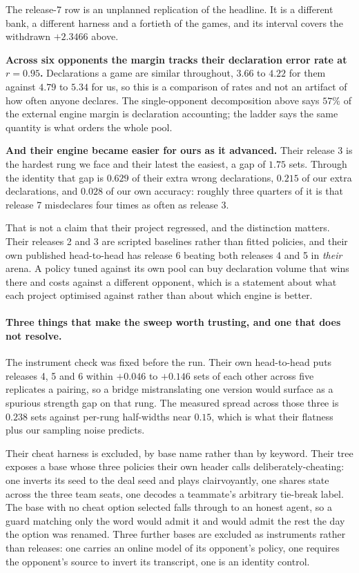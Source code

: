 \documentclass[11pt,letterpaper]{article}
\begin{document}
\noindent The release-7 row is an unplanned replication of the headline. It is a
different bank, a different harness and a fortieth of the games, and its
interval covers the withdrawn $+2.3466$ above.

\textbf{Across six opponents the margin tracks their declaration error rate at
$r = 0.95$.} Declarations a game are similar throughout, $3.66$ to $4.22$ for
them against $4.79$ to $5.34$ for us, so this is a comparison of rates and not
an artifact of how often anyone declares. The single-opponent decomposition
above says $57\%$ of the external engine margin is declaration accounting; the ladder
says the same quantity is what orders the whole pool.

\textbf{And their engine became easier for ours as it advanced.} Their release
3 is the hardest rung we face and their latest the easiest, a gap of $1.75$ sets.
Through the identity that gap is $0.629$ of their extra wrong declarations,
$0.215$ of our extra declarations, and $0.028$ of our own accuracy: roughly
three quarters of it is that release 7 misdeclares four times as often as release 3.

That is not a claim that their project regressed, and the distinction matters.
Their releases 2 and 3 are scripted baselines rather than fitted policies, and
their own published head-to-head has release 6 beating both releases 4 and 5 in
\emph{their} arena. A policy tuned against its own pool can buy declaration
volume that wins there and costs against a different opponent, which is a
statement about what each project optimised against rather than about which
engine is better.

\paragraph{Three things that make the sweep worth trusting, and one that does
not resolve.} The instrument check was fixed before the run. Their own
head-to-head puts releases 4, 5 and 6 within $+0.046$ to $+0.146$ sets of each
other across five replicates a pairing, so a bridge mistranslating one version
would surface as a spurious strength gap on that rung. The measured spread
across those three is $0.238$ sets against per-rung half-widths near $0.15$,
which is what their flatness plus our sampling noise predicts.

Their cheat harness is excluded, by base name rather than by keyword. Their
tree exposes a base whose three policies their own header calls
deliberately-cheating: one inverts its seed to the deal seed and plays
clairvoyantly, one shares state across the three team seats, one decodes a
teammate's arbitrary tie-break label. The base with no cheat option selected
falls through to an honest agent, so a guard matching only the word would
admit it and would admit the rest the day the option was renamed. Three
further bases are excluded as instruments rather than releases: one carries an
online model of its opponent's policy, one requires the opponent's source to
invert its transcript, one is an identity control.
\end{document}
